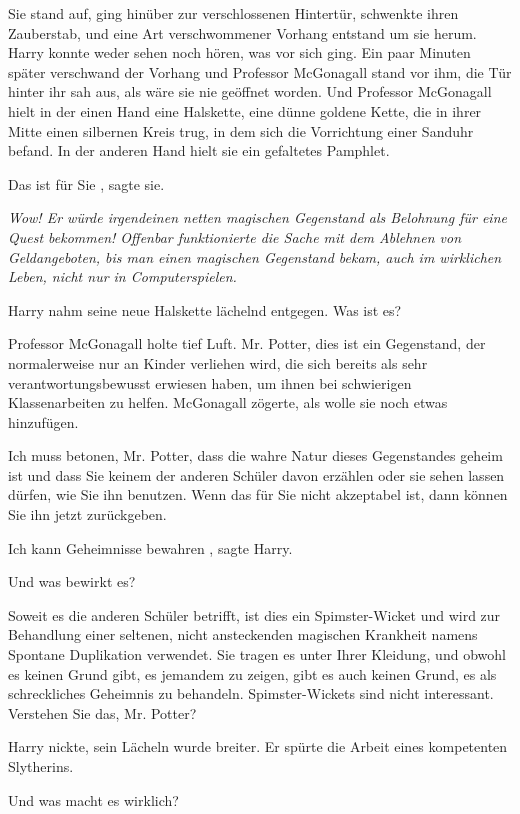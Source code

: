 Sie stand auf, ging hinüber zur verschlossenen Hintertür, schwenkte ihren
Zauberstab, und eine Art verschwommener Vorhang entstand um sie herum. Harry
konnte weder sehen noch hören, was vor sich ging. Ein paar Minuten später
verschwand der Vorhang und Professor McGonagall stand vor ihm, die Tür hinter
ihr sah aus, als wäre sie nie geöffnet worden. Und Professor McGonagall hielt in
der einen Hand eine Halskette, eine dünne goldene Kette, die in ihrer Mitte
einen silbernen Kreis trug, in dem sich die Vorrichtung einer Sanduhr befand. In
der anderen Hand hielt sie ein gefaltetes Pamphlet.

\glqq Das ist für Sie\grqq{} , sagte sie.

\emph{Wow! Er würde irgendeinen netten magischen Gegenstand als Belohnung für
eine Quest bekommen! Offenbar funktionierte die Sache mit dem Ablehnen von
Geldangeboten, bis man einen magischen Gegenstand bekam, auch im wirklichen
Leben, nicht nur in Computerspielen.}

Harry nahm seine neue Halskette lächelnd entgegen. \glqq Was ist es?\grqq{}

Professor McGonagall holte tief Luft. \glqq Mr. Potter, dies ist ein Gegenstand,
der normalerweise nur an Kinder verliehen wird, die sich bereits als sehr
verantwortungsbewusst erwiesen haben, um ihnen bei schwierigen Klassenarbeiten
zu helfen.\grqq{} McGonagall zögerte, als wolle sie noch etwas hinzufügen.

\glqq Ich muss betonen, Mr. Potter, dass die wahre Natur dieses Gegenstandes
geheim ist und dass Sie keinem der anderen Schüler davon erzählen oder sie sehen
lassen dürfen, wie Sie ihn benutzen. Wenn das für Sie nicht akzeptabel ist, dann
können Sie ihn jetzt zurückgeben.\grqq{}

\glqq Ich kann Geheimnisse bewahren\grqq{} , sagte Harry.

\glqq Und was bewirkt es?\grqq{}

\glqq Soweit es die anderen Schüler betrifft, ist dies ein Spimster-Wicket und
wird zur Behandlung einer seltenen, nicht ansteckenden magischen Krankheit
namens Spontane Duplikation verwendet. Sie tragen es unter Ihrer Kleidung, und
obwohl es keinen Grund gibt, es jemandem zu zeigen, gibt es auch keinen Grund,
es als schreckliches Geheimnis zu behandeln. Spimster-Wickets sind nicht
interessant. Verstehen Sie das, Mr. Potter?\grqq{}

Harry nickte, sein Lächeln wurde breiter. Er spürte die Arbeit eines kompetenten
Slytherins.

\glqq Und was macht es wirklich?\grqq{}

